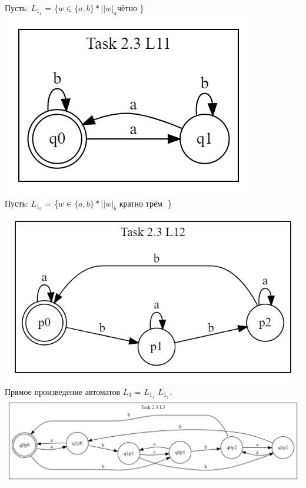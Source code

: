 \documentclass{article}
\begin{document}
Пусть: 
$L_1_1$ = \{$ w \in \{a,b\}*   $|$  {|w|_a} $чётно$ $ \} \\
\newline\includegraphics[scale=0.4]{2_3_1.png}
\\Пусть:
$L_1_2$ = \{$ w \in \{a,b\}*   $|$  {|w|_b} $ кратно трём $ $ \} \\
\newline\includegraphics[scale=0.4]{2_3_2.png}
\\Прямое произведение  автоматов $L_3$ = $L_1_1$ \cap $L_1_2$.
\newline\includegraphics[scale=0.25]{2_3_3.png}

\end{document}
